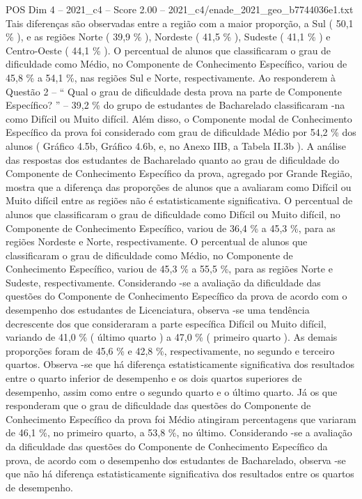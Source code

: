 \begin{textsample}{POS Dim 4 – 2021\_c4 – Score 2.00 – 2021\_c4/enade\_2021\_geo\_b7744036e1.txt}
Tais diferenças são observadas entre a região com a maior proporção, a Sul ( 50,1 \% ), e as regiões Norte ( 39,9 \% ), Nordeste ( 41,5 \% ), Sudeste ( 41,1 \% ) e Centro-Oeste ( 44,1 \% ).
O percentual de alunos que classificaram o grau de dificuldade como Médio, no Componente de Conhecimento Específico, variou de 45,8 \% a 54,1 \%, nas regiões Sul e Norte, respectivamente.
Ao responderem à Questão 2 – “ Qual o grau de dificuldade desta prova na parte de Componente Específico? ” – 39,2 \% do grupo de estudantes de Bacharelado classificaram -na como Difícil ou Muito difícil.
Além disso, o Componente modal de Conhecimento Específico da prova foi considerado com grau de dificuldade Médio por 54,2 \% dos alunos ( Gráfico 4.5b, Gráfico 4.6b, e, no Anexo IIB, a Tabela II.3b ).
A análise das respostas dos estudantes de Bacharelado quanto ao grau de dificuldade do Componente de Conhecimento Específico da prova, agregado por Grande Região, mostra que a diferença das proporções de alunos que a avaliaram como Difícil ou Muito difícil entre as regiões não é estatisticamente significativa.
O percentual de alunos que classificaram o grau de dificuldade como Difícil ou Muito difícil, no Componente de Conhecimento Específico, variou de 36,4 \% a 45,3 \%, para as regiões Nordeste e Norte, respectivamente.
O percentual de alunos que classificaram o grau de dificuldade como Médio, no Componente de Conhecimento Específico, variou de 45,3 \% a 55,5 \%, para as regiões Norte e Sudeste, respectivamente.
Considerando -se a avaliação da dificuldade das questões do Componente de Conhecimento Específico da prova de acordo com o desempenho dos estudantes de Licenciatura, observa -se uma tendência decrescente dos que consideraram a parte específica Difícil ou Muito difícil, variando de 41,0 \% ( último quarto ) a 47,0 \% ( primeiro quarto ).
As demais proporções foram de 45,6 \% e 42,8 \%, respectivamente, no segundo e terceiro quartos.
Observa -se que há diferença estatisticamente significativa dos resultados entre o quarto inferior de desempenho e os dois quartos superiores de desempenho, assim como entre o segundo quarto e o último quarto.
Já os que responderam que o grau de dificuldade das questões do Componente de Conhecimento Específico da prova foi Médio atingiram percentagens que variaram de 46,1 \%, no primeiro quarto, a 53,8 \%, no último.
Considerando -se a avaliação da dificuldade das questões do Componente de Conhecimento Específico da prova, de acordo com o desempenho dos estudantes de Bacharelado, observa -se que não há diferença estatisticamente significativa dos resultados entre os quartos de desempenho.

\end{textsample}
